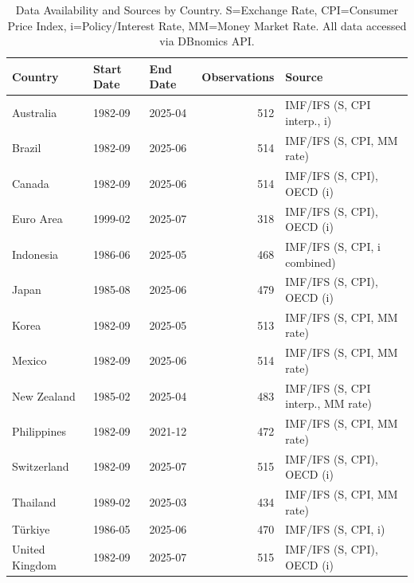 \documentclass[a4paper,10pt,final]{article}    %
\begin{document}
\begin{table}[htbp]
    \centering
    \caption{Data Availability and Sources by Country. S=Exchange Rate, CPI=Consumer Price Index, i=Policy/Interest Rate, MM=Money Market Rate. All data accessed via DBnomics API.}
    \label{tab:data_availability}
    \begin{tabular}{lllrl}
        \toprule
        Country        & Start Date & End Date & Observations & Source                            \\
        \midrule
        Australia      & 1982-09    & 2025-04  & 512          & IMF/IFS (S, CPI interp., i)       \\
        Brazil         & 1982-09    & 2025-06  & 514          & IMF/IFS (S, CPI, MM rate)         \\
        Canada         & 1982-09    & 2025-06  & 514          & IMF/IFS (S, CPI), OECD (i)        \\
        Euro Area      & 1999-02    & 2025-07  & 318          & IMF/IFS (S, CPI), OECD (i)        \\
        Indonesia      & 1986-06    & 2025-05  & 468          & IMF/IFS (S, CPI, i combined)      \\
        Japan          & 1985-08    & 2025-06  & 479          & IMF/IFS (S, CPI), OECD (i)        \\
        Korea          & 1982-09    & 2025-05  & 513          & IMF/IFS (S, CPI, MM rate)         \\
        Mexico         & 1982-09    & 2025-06  & 514          & IMF/IFS (S, CPI, MM rate)         \\
        New Zealand    & 1985-02    & 2025-04  & 483          & IMF/IFS (S, CPI interp., MM rate) \\
        Philippines    & 1982-09    & 2021-12  & 472          & IMF/IFS (S, CPI, MM rate)         \\
        Switzerland    & 1982-09    & 2025-07  & 515          & IMF/IFS (S, CPI), OECD (i)        \\
        Thailand       & 1989-02    & 2025-03  & 434          & IMF/IFS (S, CPI, MM rate)         \\
        Türkiye        & 1986-05    & 2025-06  & 470          & IMF/IFS (S, CPI, i)               \\
        United Kingdom & 1982-09    & 2025-07  & 515          & IMF/IFS (S, CPI), OECD (i)        \\
        \bottomrule
    \end{tabular}
\end{table}
\end{document}
